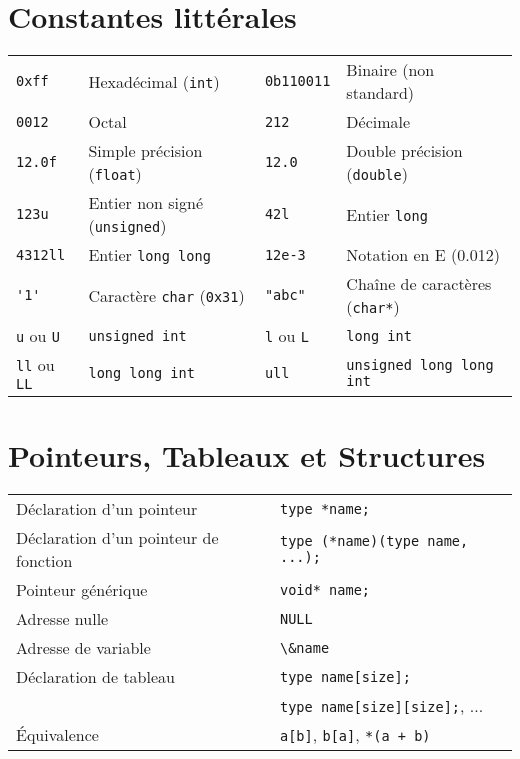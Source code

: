 \documentclass{article}
\newcommand{\cd}{\lstinline}
\begin{document}
\begin{multicols*}{3}
\section*{Constantes littérales}

\begin{tabularx}{\linewidth}{
  >{\hsize=0.5\hsize}X%
  >{\hsize=1.5\hsize}X%
  >{\hsize=0.5\hsize}X%
  >{\hsize=1.5\hsize}X%
  }

  \cd{0xff}    & Hexadécimal (\texttt{int}) & \cd{0b110011}    & Binaire (non standard) \\
  \cd{0012}    & Octal & \cd{212}    & Décimale \\ \hline
  \cd{12.0f}   & Simple précision (\cd{float})& \cd{12.0}    & Double précision (\cd{double})\\ \hline
  \cd{123u}    & Entier non signé (\cd{unsigned}) & \cd{42l}     & Entier \cd{long} \\
  \cd{4312ll}  & Entier \cd{long long} & \cd{12e-3} & Notation en E (0.012) \\ \hline
  \cd{'1'}  & Caractère \cd{char} (\cd{0x31}) & \cd{"abc"} & Chaîne de caractères (\cd{char*}) \\ \hline
  \cd{u} ou \cd{U}  & \cd{unsigned int} & \cd{l} ou \cd{L} & \cd{long int} \\
  \cd{ll} ou \cd{LL}  & \cd{long long int} & \cd{ull} & \cd{unsigned long long int} \\
\end{tabularx}

\section*{Pointeurs, Tableaux et Structures}
\begin{tabularx}{\linewidth}{Xl}
  Déclaration d'un pointeur & \cd{type *name;} \\
  Déclaration d'un pointeur de fonction & \cd{type (*name)(type name, ...);} \\
  Pointeur générique & \cd{void* name;} \\
  Adresse nulle & \cd{NULL} \\
  Adresse de variable & \cd{\&name} \\
  Déclaration de tableau & \cd{type name[size];} \\
                         & \cd{type name[size][size];}, ... \\
  Équivalence & \cd{a[b]}, \cd{b[a]}, \cd{*(a + b)}
\end{tabularx}


\end{multicols*}
\end{document}
